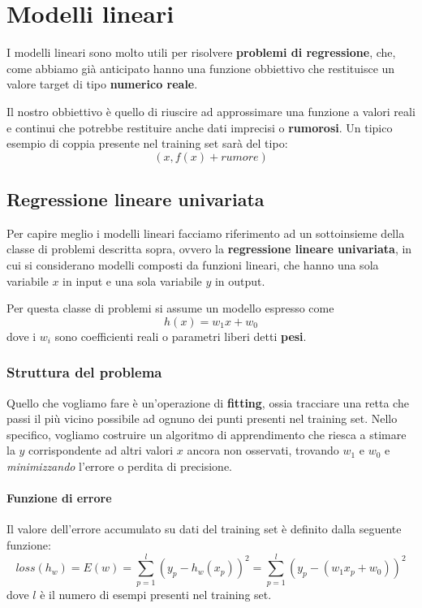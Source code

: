 \chapter{Modelli lineari}
I modelli lineari sono molto utili per risolvere \textbf{problemi di regressione}, che, come abbiamo gi\`a anticipato
hanno una funzione obbiettivo che restituisce un valore target di tipo \textbf{numerico reale}.

Il nostro obbiettivo \`e quello di riuscire ad approssimare una funzione a valori reali e continui che potrebbe restituire
anche dati imprecisi o \textbf{rumorosi}. Un tipico esempio di coppia presente nel training set sar\`a del tipo:
\[ (x, f(x) + rumore) \]

\section{Regressione lineare univariata}
Per capire meglio i modelli lineari facciamo riferimento ad un sottoinsieme della classe di problemi descritta sopra, ovvero
la \textbf{regressione lineare univariata}, in cui si considerano modelli composti da funzioni lineari, che hanno una sola
variabile $x$ in input e una sola variabile $y$ in output.

Per questa classe di problemi si assume un modello espresso come
\[ h(x) = w_1 x + w_0 \]
dove i $w_i$ sono coefficienti reali o parametri liberi detti \textbf{pesi}.

\subsection{Struttura del problema}
Quello che vogliamo fare \`e un'operazione di \textbf{fitting}, ossia tracciare una retta che passi il pi\`u vicino
possibile ad ognuno dei punti presenti nel training set. Nello specifico, vogliamo costruire un algoritmo di apprendimento
che riesca a stimare la $y$ corrispondente ad altri valori $x$ ancora non osservati, trovando $w_1$ e $w_0$ e
\emph{minimizzando} l'errore o perdita di precisione.

\subsubsection{Funzione di errore}
Il valore dell'errore accumulato su dati del training set \`e definito dalla seguente funzione:
\[ loss(h_w) = E(w) = \sum_{p=1}^l (y_p - h_w(x_p))^2 = \sum_{p=1}^l (y_p - (w_1 x_p + w_0))^2 \]
dove $l$ \`e il numero di esempi presenti nel training set.

